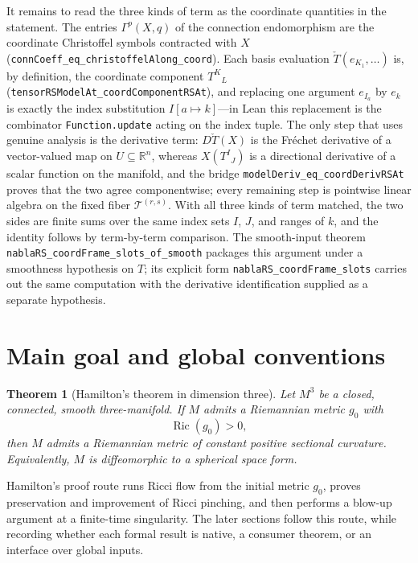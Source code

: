 \documentclass[11pt]{article}
\theoremstyle{plain}
\newtheorem{theorem}{Theorem}[section]
\theoremstyle{definition}
\theoremstyle{remark}
\newcommand{\Ric}{\operatorname{Ric}}
\newcommand{\leanref}[1]{\nolinkurl{#1}}
\begin{document}
It remains to read the three kinds of term as the coordinate quantities in the
statement.  The entries $\Gamma^p(X,q)$ of the connection endomorphism are the
coordinate Christoffel symbols contracted with $X$
(\leanref{connCoeff_eq_christoffelAlong_coord}).  Each basis evaluation
$\check T(e_{K_1},\dots)$ is, by definition, the coordinate component $T^K{}_L$
(\leanref{tensorRSModelAt_coordComponentRSAt}), and replacing one argument
$e_{I_a}$ by $e_k$ is exactly the index substitution $I[a\mapsto k]$---in Lean
this replacement is the combinator \texttt{Function.update} acting on the index
tuple.  The only step that uses genuine analysis is the derivative term:
$D\check T(X)$ is the Fr\'echet derivative of a vector-valued map on
$U\subseteq\mathbb R^n$, whereas $X(T^I{}_J)$ is a directional derivative of a
scalar function on the manifold, and the bridge
\leanref{modelDeriv_eq_coordDerivRSAt} proves that the two agree componentwise;
every remaining step is pointwise linear algebra on the fixed fiber
$\mathcal T^{(r,s)}$.  With all three kinds of term matched, the two sides are
finite sums over the same index sets $I$, $J$, and ranges of $k$, and the
identity follows by term-by-term comparison.  The smooth-input theorem
\leanref{nablaRS_coordFrame_slots_of_smooth} packages this argument under a
smoothness hypothesis on $T$; its explicit form
\leanref{nablaRS_coordFrame_slots} carries out the same computation with the
derivative identification supplied as a separate hypothesis.



\section{Main goal and global conventions}

\begin{theorem}[Hamilton's theorem in dimension three]
\label{thm:main-hamilton-3d}
Let $M^3$ be a closed, connected, smooth three-manifold. If $M$ admits a
Riemannian metric $g_0$ with
\[
\Ric(g_0)>0,
\]
then $M$ admits a Riemannian metric of constant positive sectional curvature.
Equivalently, $M$ is diffeomorphic to a spherical space form.
\end{theorem}


Hamilton's proof route runs Ricci flow from the initial metric \(g_0\), proves
preservation and improvement of Ricci pinching, and then performs a blow-up
argument at a finite-time singularity.  The later sections follow this route,
while recording whether each formal result is native, a consumer theorem, or an
interface over global inputs.
\end{document}
